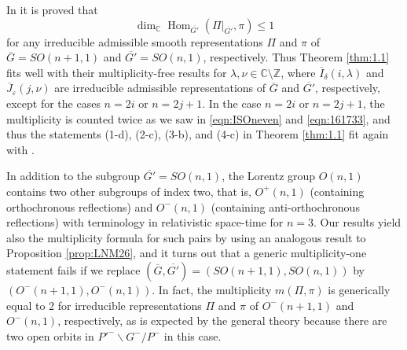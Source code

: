 \begin{remark}
\label{rem:mult1}
In \cite{SunZhu}
 it is proved that 
$$
   \dim_{\mathbb{C}}\operatorname{Hom}_{{\overline{G'}}}(\Pi|_{{\overline{G'}}},\pi) \le 1
$$
 for any irreducible admissible smooth representations
 $\Pi$ and $\pi$ of ${\overline{G}}=SO(n+1,1)$ and ${\overline{G'}}=SO(n,1)$, 
respectively.  
Thus Theorem \ref{thm:1.1} fits well 
 with their multiplicity-free results 
 for 
  $\lambda, \nu \in {\mathbb{C}}\setminus {\mathbb{Z}}$, 
 where ${\overline{I}}_{\delta}(i,\lambda)$ and ${\overline{J}}_{\varepsilon}(j,\nu)$
 are irreducible admissible representations
 of ${\overline{G}}$ and ${\overline{G'}}$, 
 respectively,
 except for the cases $n=2 i$ or $n= 2j+1$.  
In the case $n=2i$ or $n=2j+1$, 
 the multiplicity is counted twice 
 as we saw in \eqref{eqn:ISOneven} and \eqref{eqn:161733}, 
 and thus the statements (1-d), (2-c), (3-b), 
 and (4-c)
 in Theorem \ref{thm:1.1} fit again with \cite{SunZhu}.  
\end{remark}
\vskip 1pc
\begin{remark}
\label{rem:mult2}
In addition to the subgroup ${\overline{G'}}=SO(n,1)$, 
 the Lorentz group $O(n,1)$ contains two other subgroups
 of index two, 
 that is, 
 $O^+(n,1)$ (containing orthochronous reflections)
 and  $O^-(n,1)$ (containing anti-orthochronous reflections)
 with terminology
 in relativistic space-time for $n=3$.  
Our results yield also the multiplicity formula for such pairs
 by using an analogous result to Proposition \ref{prop:LNM26},
and it turns out that a 
generic multiplicity-one statement
 fails 
 if we replace $({\overline{G}},{\overline{G'}})=(SO(n+1,1),SO(n,1))$
 by $(O^-(n+1,1),O^-(n,1))$.  
In fact, 
 the multiplicity $m(\Pi, \pi)$ is generically equal to 2
 for irreducible representations $\Pi$ and $\pi$
 of $O^-(n+1,1)$ and $O^-(n,1)$, 
 respectively, 
 as is expected by the general theory \cite{xKOfm, sbon}
 because there are two open orbits
 in $P'^{-} \backslash G^-/P^-$ in this case.  
\end{remark} 


